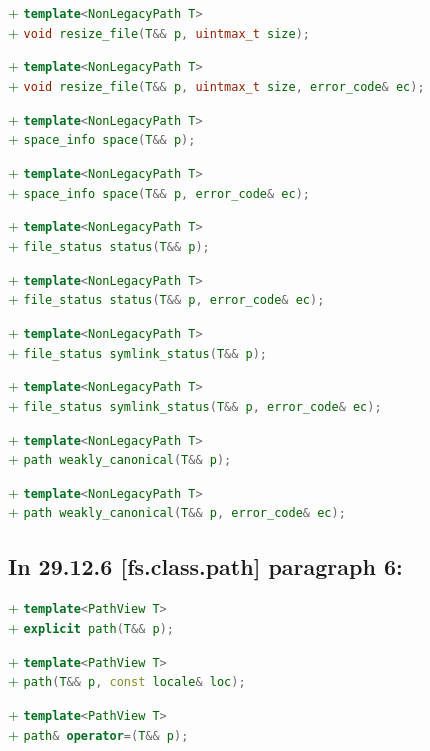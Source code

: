 \documentclass[11pt]{article}
\newcommand{\code}[2][cpp]{\lstinline[language=#1,basicstyle=\small\ttfamily]{#2}}
\newcommand{\tsrefp}[3]{\subsection*{In #2 \textbf{[#1]} paragraph #3:}}
\newcommand{\tsreplace}[3]{\textcolor{red}{\sout{#1}}#2\textcolor{darkgreen}{#3}}
\begin{document}
\tsreplace{}{}{+ \code{template<NonLegacyPath T>}}\\
\tsreplace{}{}{+ \code{void resize_file(T&& p, uintmax_t size);}}

\tsreplace{}{}{+ \code{template<NonLegacyPath T>}}\\
\tsreplace{}{}{+ \code{void resize_file(T&& p, uintmax_t size, error_code& ec);}}

\tsreplace{}{}{+ \code{template<NonLegacyPath T>}}\\
\tsreplace{}{}{+ \code{space_info space(T&& p);}}

\tsreplace{}{}{+ \code{template<NonLegacyPath T>}}\\
\tsreplace{}{}{+ \code{space_info space(T&& p, error_code& ec);}}

\tsreplace{}{}{+ \code{template<NonLegacyPath T>}}\\
\tsreplace{}{}{+ \code{file_status status(T&& p);}}

\tsreplace{}{}{+ \code{template<NonLegacyPath T>}}\\
\tsreplace{}{}{+ \code{file_status status(T&& p, error_code& ec);}}

\tsreplace{}{}{+ \code{template<NonLegacyPath T>}}\\
\tsreplace{}{}{+ \code{file_status symlink_status(T&& p);}}

\tsreplace{}{}{+ \code{template<NonLegacyPath T>}}\\
\tsreplace{}{}{+ \code{file_status symlink_status(T&& p, error_code& ec);}}

\tsreplace{}{}{+ \code{template<NonLegacyPath T>}}\\
\tsreplace{}{}{+ \code{path weakly_canonical(T&& p);}}

\tsreplace{}{}{+ \code{template<NonLegacyPath T>}}\\
\tsreplace{}{}{+ \code{path weakly_canonical(T&& p, error_code& ec);}}


\tsrefp{fs.class.path}{29.12.6}{6}

\tsreplace{}{}{+ \code{template<PathView T>}}\\
\tsreplace{}{}{+ \code{explicit path(T&& p);}}

\tsreplace{}{}{+ \code{template<PathView T>}}\\
\tsreplace{}{}{+ \code{path(T&& p, const locale& loc);}}

\tsreplace{}{}{+ \code{template<PathView T>}}\\
\tsreplace{}{}{+ \code{path& operator=(T&& p);}}
\end{document}

